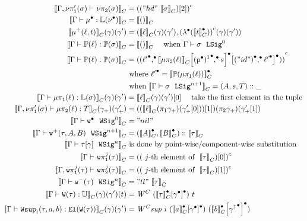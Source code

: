 \begin{align*}
  \denotesC{\goodType{\Gm, \lsigprojT{\lsig}}{\lsigproj{2}{\lsig}}{}} &= \Gmodel{("hd"~\denotesC{\lsig})[2]}\\
  \denotesC{\goodTerm{\Gm}{\LkgEmp}{\TyLkg{\LSigEmp}}} &= \denotesC{\unit} \\
  \denotesC{{\LkgAdd{\lkg}{t}}}(\gm)(\gm') &= (\denotesC{\lkg}(\gm)(\gm') , \Gmodel{\Glam{\denotesCC{t}}}(\gm)(\gm')) \\
  \denotesC{\goodTerm{\Gm}{\Tkg{\lkg}}{\TyTkg{\lsig}}} &= \denotesC{\unit}
  \quad \text{ when \goodSig{\Gm}{\lsig}{0}} \\
  \denotesC{\goodTerm{\Gm}{\Tkg{\lkg}}{\TyTkg{\lsig}}} &= \Gmodel{\Gpair{\Glued{\ell'}}{\Gsub{\Gsub{\denotesC{\lkgproj{2}{\lkg}}}{\GSubstExt{\Glued{\GSubstWeak{1}}}{s}}}{\GSubstExt{\Glued{("id")}}{ \Glued{\ell'} }}}}
  \\ &\text{ where } \Glued{\ell'} = \denotesCC{\Tkg{\lkgproj{1}{\lkg}}} 
  \\ &\text{ when } \denotesC{\goodSig{\Gm}{\lsig}{n+1}} = (A, s, T)::\_ \\
  \denotesC{\goodTerm{\Gm}{\lkgproj{1}{\lkg}}{\TyLkg{\lsig}}}(\gm)(\gm') &= \denotesC{\ell}(\gm)(\gm')[0] \quad \text{ take the first element in the tuple} \\
  \denotesC{\goodTerm{\Gm, \lsigprojT{\lsig}}{\lkgproj{2}{\lkg}}{T}}(\gm_+)(\gm_+') &= ((\denotesC{\ell}(\pi_1{\gm_+})(\gm_+'[0]))[1])(\pi_2{\gm_+})(\gm_+'[1]) \\
  \denotesC{\goodWSig{\Gm}{\WSigEmp}{0}} &= "nil" \\
  \denotesC{\goodWSig{\Gm}{\WSigAdd{\wsig}{A}{B}}{n+1}} &= (\denotesCC{A} , \denotesCC{B}) :: \denotesC{\wsig}\\
  \denotesC{\goodWSig{\Gm}{\sub{\wsig}{\gm}}{n}} & \text{ is done by point-wise/component-wise substitution} \\
  \denotesC{\goodType{\Gm}{\wsigproj{j}{1}{\wsig}}{}} &= \Gmodel{(\text{ $j$-th element of }~\denotesC{\wsig})[0]}\\
  \denotesC{\goodType{\Gm, \wsigproj{j}{1}{\wsig}}{\wsigproj{j}{2}{\wsig}}{}} &= \Gmodel{(\text{ $j$-th element of }~\denotesC{\wsig})[1]}\\
  \denotesC{\goodWSig{\Gm}{\WSigSub{\wsig}}{n}} &= "tl"~\denotesC{\wsig}\\
  \denotesC{\goodTerm{\Gm}{\wcode{\wsig}}{\cU}}(\gm)(\gm')(t) &= \CWmodel~(\Gsub{\denotesCC{\wsig}}{\Glued{\gm}})~t \\
  \denotesC{\goodTerm{\Gm}{\Wsup{i}{\wsig}{a}{b}}{\El{\wcode{\wsig}}}}(\gm)(\gm') &= \CWsup~i~(\Gsub{\denotesCC{a}}{\Glued{\gm}})~(\Gsub{\denotesCC{b}}{{\Glued{\gm^\uparrow}}}) \\

\end{align*}
